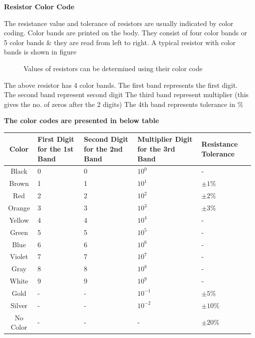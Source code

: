 \noindent \textbf{Resistor Color Code}

\noindent The resistance value and tolerance of resistors are usually indicated by color coding. Color bands are printed on the body. They consist of four color bands or 5 color bands \& they are read from left to right. A typical resistor with color bands is shown in figure 

\begin{figure}[H]
    \centering
    
    \caption{Values of resistors can be determined using their color code}
    \label{fig:colorcode}
\end{figure}

\noindent The above resistor has 4 color bands. The first band represents the first digit. The second band represent second digit The third band represent multiplier (this gives the no. of zeros after the 2 digits) The 4th band represents tolerance in \% 

\vspace{1 cm}
\noindent \textbf{The color codes are presented in below table}

\begin{table}[H]
    \centering
    \renewcommand{\arraystretch}{1.2}
    \setlength{\tabcolsep}{8pt}
    
    \begin{tabular}{c| m{2.5cm} |m{2.5cm}|m{2.5cm}|m{2.5cm}}
    \hline
        Color & First Digit for the 1st Band &  Second Digit for the 2nd Band & Multiplier Digit for the 3rd Band & Resistance Tolerance\\
    \hline \hline    
        Black & 0 & 0 & $10^0$ & - \\
        Brown & 1 & 1 & $10^1$ & $\pm 1\%$\\
        Red & 2 & 2 & $10^2$  & $\pm 2\%$ \\
        Orange & 3 & 3 & $10^3$ & $\pm 3\%$ \\ 
        Yellow & 4 & 4 & $10^4$ & - \\ 
        Green & 5 & 5 & $10^5$ & - \\
        Blue & 6 & 6 & $10^6$ & - \\ 
        Violet & 7 & 7 & $10^7$ & - \\
        Gray & 8 & 8 & $10^8$ & - \\ 
        White & 9 & 9 & $10^9$ & - \\ 
        Gold & - & - & $10^{-1}$ & $\pm 5\%$ \\
        Silver & - & - & $10^{-2}$ & $\pm 10\%$ \\
        No Color & - & - & - & $\pm 20\%$ \\
        
    \hline 
    \end{tabular}

    \label{tab:my_label}
\end{table}

